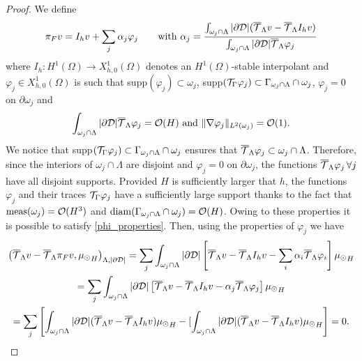 \documentclass[r]{siamart171218}
\begin{document}
\begin{proof}
We define
\begin{equation*}
\pi_F v = I_h v + \sum _j \alpha _j \varphi _j \qquad \text{with }\alpha_j =\frac{\int_{\omega _j \cap \Lambda}|\partial\mathcal{D}| ({\overline{\mathcal{T}}_\Lambda} v-{\overline{\mathcal{T}}_\Lambda} I_h v)}{\int_{\omega _j \cap \Lambda}|\partial\mathcal{D}|{\overline{\mathcal{T}}_\Lambda} \varphi _j}
\end{equation*}
where $I_h: H^1(\Omega) \rightarrow X_{h,0}^1(\Omega)$ denotes an $H^1(\Omega)$-stable interpolant
and $\varphi_j \in X_{h,0}^1(\Omega)$ is such that supp$(\varphi_j)\subset \omega_j$, supp$({\mathcal{T}_\Gamma} \varphi _j) \subset \Gamma_{\omega _j\cap \Lambda}\cap \omega_j$, $\varphi_j =0$ on $\partial \omega _j$ and 
\begin{equation}\label{phi_properties}
\int_{\patch\cap \Lambda}|\DD|\mtrace \varphi_j=\mathcal{O}(H) \text{ and } \|\nabla \varphi _j\|_{L^2(\omega _j)}=\mathcal{O}(1). 
\end{equation}
We notice that supp$({\mathcal{T}_\Gamma} \varphi_j) \subset \Gamma_{\omega _j\cap \Lambda}\cap \omega_j$ ensures that ${\overline{\mathcal{T}}_\Lambda} \varphi_j \subset \omega_j\cap \Lambda$. Therefore, since the interiors of $\omega_j\cap \Lambda$  are disjoint and $\varphi _j = 0 $ on $\partial \omega_j$,  the functions ${\overline{\mathcal{T}}_\Lambda} \varphi_j\, \forall j$ have all disjoint supports. Provided $H$ is sufficiently larger that $h$, the functions $\varphi _j$ and their traces ${\mathcal{T}_\Gamma} \varphi _j$ have a sufficiently large support thanks to the fact that $\mathrm{meas}(\omega _j) = \mathcal{O}(H^3)$ and $\mathrm{diam}(\Gamma_{\omega _j\cap \Lambda} \cap \omega_j)=\mathcal{O}(H)$.
Owing to these properties it is possible to satisfy \eqref{phi_properties}. 
Then, using the properties of $\varphi_j$ we have
\begin{multline*}
\left({\overline{\mathcal{T}}_\Lambda} v - {\overline{\mathcal{T}}_\Lambda} \pi _F v  , {\mu_{\odot}}_H\right)_{\Lambda, |\partial\mathcal{D}|} = \sum _j \int_{\omega _j\cap \Lambda} |\partial\mathcal{D} |\left[ {\overline{\mathcal{T}}_\Lambda} v-{\overline{\mathcal{T}}_\Lambda} I_h v-\sum _i \alpha_i {\overline{\mathcal{T}}_\Lambda} \varphi _i \right]{\mu_{\odot}}_H \\
=\sum _j \int_{\omega _j\cap \Lambda}|\partial\mathcal{D}| \left[ {\overline{\mathcal{T}}_\Lambda} v-{\overline{\mathcal{T}}_\Lambda} I_h v-\alpha_j {\overline{\mathcal{T}}_\Lambda} \varphi _j \right]{\mu_{\odot}}_H
\\
=\sum _j \left[\int_{\omega _j\cap \Lambda} |\partial\mathcal{D}| ({\overline{\mathcal{T}}_\Lambda} v-{\overline{\mathcal{T}}_\Lambda}  I_h v) {\mu_{\odot}}_H
-[\int_{\omega _j\cap \Lambda} |\partial\mathcal{D}| ({\overline{\mathcal{T}}_\Lambda} v-{\overline{\mathcal{T}}_\Lambda}  I_h v) {\mu_{\odot}}_H \right]=0.
\end{multline*}

\end{proof}
\end{document}
